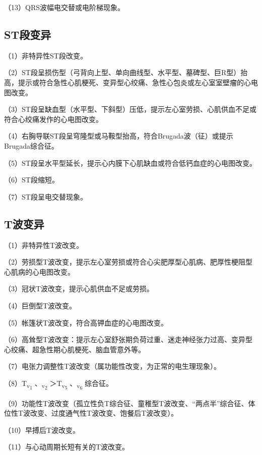 （13）QRS波幅电交替或电阶梯现象。

\protect\hypertarget{text00057.htmlux5cux23subid683}{}{}

\subsection{ST段变异}

（1）非特异性ST段改变。

（2）ST段呈损伤型（弓背向上型、单向曲线型、水平型、墓碑型、巨R型）抬高，提示或符合急性心肌梗死、变异型心绞痛、急性心包炎或左心室室壁瘤的心电图改变。

（3）ST段呈缺血型（水平型、下斜型）压低，提示左心室劳损、心肌供血不足或符合心绞痛发作的心电图改变。

（4）右胸导联ST段呈穹隆型或马鞍型抬高，符合Brugada波（征）或提示Brugada综合征。

（5）ST段呈水平型延长，提示心内膜下心肌缺血或符合低钙血症的心电图改变。

（6）ST段缩短。

（7）ST段呈电交替现象。

\protect\hypertarget{text00057.htmlux5cux23subid684}{}{}

\subsection{T波变异}

（1）非特异性T波改变。

（2）劳损型T波改变，提示左心室劳损或符合心尖肥厚型心肌病、肥厚性梗阻型心肌病的心电图改变。

（3）冠状T波改变，提示心肌供血不足或劳损。

（4）巨倒型T波改变。

（5）帐篷状T波改变，符合高钾血症的心电图改变。

（6）高耸型T波改变：提示左心室舒张期负荷过重、迷走神经张力过高、变异型心绞痛、超急性期心肌梗死、脑血管意外等。

（7）电张力调整性T波改变（属功能性改变，为正常的电生理现象）。

（8）T\textsubscript{v\textsubscript{1}}
、\textsubscript{v\textsubscript{2}}
＞T\textsubscript{v\textsubscript{5}}
、\textsubscript{v\textsubscript{6}} 综合征。

（9）功能性T波改变（孤立性负T综合征、童稚型T波改变、“两点半”综合征、体位性T波改变、过度通气性T波改变、饱餐后T波改变）。

（10）早搏后T波改变。

（11）与心动周期长短有关的T波改变。

